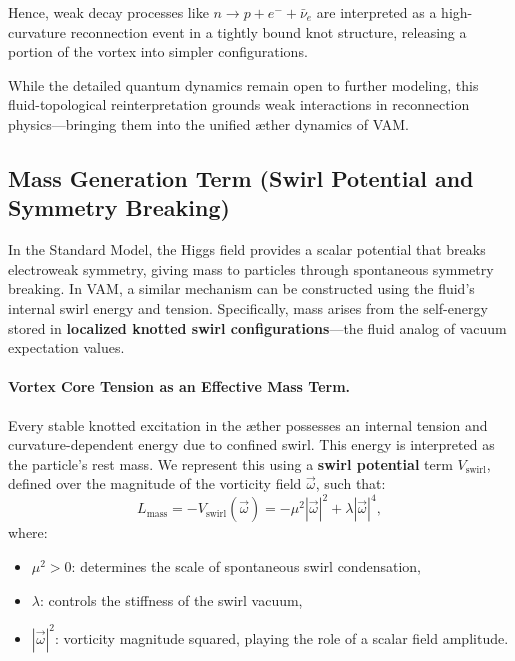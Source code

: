 Hence, weak decay processes like \( n \to p + e^- + \bar{\nu}_e \) are interpreted as a high-curvature reconnection event in a tightly bound knot structure, releasing a portion of the vortex into simpler configurations.

\medskip
While the detailed quantum dynamics remain open to further modeling, this fluid-topological reinterpretation grounds weak interactions in reconnection physics—bringing them into the unified æther dynamics of VAM.

\subsection{Mass Generation Term (Swirl Potential and Symmetry Breaking)}

In the Standard Model, the Higgs field provides a scalar potential that breaks electroweak symmetry, giving mass to particles through spontaneous symmetry breaking. In VAM, a similar mechanism can be constructed using the fluid’s internal swirl energy and tension. Specifically, mass arises from the self-energy stored in \textbf{localized knotted swirl configurations}—the fluid analog of vacuum expectation values.

\vspace{0.5em}
\paragraph{Vortex Core Tension as an Effective Mass Term.}
Every stable knotted excitation in the æther possesses an internal tension and curvature-dependent energy due to confined swirl. This energy is interpreted as the particle’s rest mass. We represent this using a \textbf{swirl potential} term \( V_{\text{swirl}} \), defined over the magnitude of the vorticity field \( \vec{\omega} \), such that:
\begin{equation}
    L_{\text{mass}} = -V_{\text{swirl}}(\vec{\omega}) = -\mu^2 |\vec{\omega}|^2 + \lambda |\vec{\omega}|^4,
    \label{eq:mass-term}
\end{equation}
where:
\begin{itemize}
    \item \( \mu^2 > 0 \): determines the scale of spontaneous swirl condensation,
    \item \( \lambda \): controls the stiffness of the swirl vacuum,
    \item \( |\vec{\omega}|^2 \): vorticity magnitude squared, playing the role of a scalar field amplitude.
\end{itemize}

